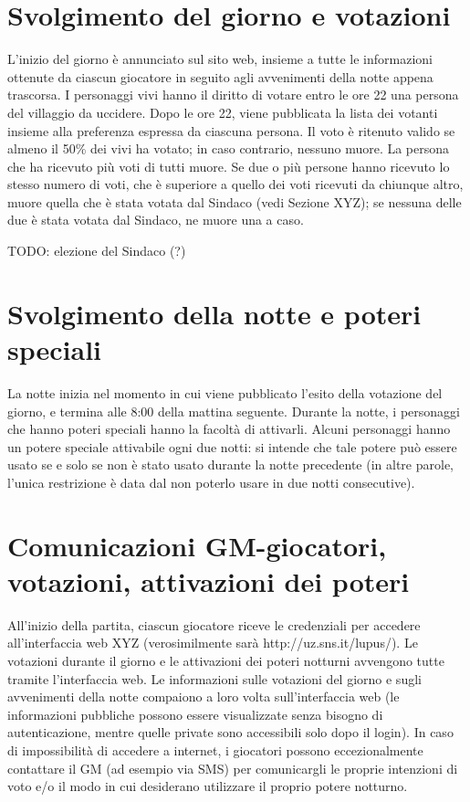 \documentclass[a4paper,10pt]{article}
\begin{document}
\section{Svolgimento del giorno e votazioni}

L'inizio del giorno è annunciato sul sito web, insieme a tutte le informazioni ottenute da ciascun giocatore in seguito agli avvenimenti della notte appena trascorsa.
I personaggi vivi hanno il diritto di votare entro le ore 22 una persona del villaggio da uccidere. Dopo le ore 22, viene pubblicata la lista dei votanti insieme alla preferenza espressa da ciascuna persona. Il voto è ritenuto valido se almeno il 50\% dei vivi ha votato; in caso contrario, nessuno muore. La persona che ha ricevuto più voti di tutti muore. Se due o più persone hanno ricevuto lo stesso numero di voti, che è superiore a quello dei voti ricevuti da chiunque altro, muore quella che è stata votata dal Sindaco (vedi Sezione XYZ); se nessuna delle due è stata votata dal Sindaco, ne muore una a caso.

TODO: elezione del Sindaco (?)


\section{Svolgimento della notte e poteri speciali}

La notte inizia nel momento in cui viene pubblicato l'esito della votazione del giorno, e termina alle 8:00 della mattina seguente.
Durante la notte, i personaggi che hanno poteri speciali hanno la facoltà di attivarli.
Alcuni personaggi hanno un potere speciale attivabile ogni due notti: si intende che tale potere può essere usato se e solo se non è stato usato durante la notte precedente (in altre parole, l'unica restrizione è data dal non poterlo usare in due notti consecutive).


\section{Comunicazioni GM-giocatori, votazioni, attivazioni dei poteri}

All'inizio della partita, ciascun giocatore riceve le credenziali per accedere all'interfaccia web XYZ (verosimilmente sarà http://uz.sns.it/lupus/).
Le votazioni durante il giorno e le attivazioni dei poteri notturni avvengono tutte tramite l'interfaccia web. Le informazioni sulle votazioni del giorno e sugli avvenimenti della notte compaiono a loro volta sull'interfaccia web (le informazioni pubbliche possono essere visualizzate senza bisogno di autenticazione, mentre quelle private sono accessibili solo dopo il login).
In caso di impossibilità di accedere a internet, i giocatori possono eccezionalmente contattare il GM (ad esempio via SMS) per comunicargli le proprie intenzioni di voto e/o il modo in cui desiderano utilizzare il proprio potere notturno.
\end{document}
